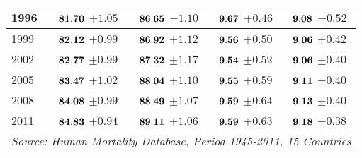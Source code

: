 \documentclass[10pt, titlepage]{article}%
\begin{document}
\begin{table}
\begin{tabular}{||l|c|c|c|c||}
  1996 &  $\bf 81.70$ $\pm 1.05$& $\bf 86.65$ $\pm 1.10$& $\bf 9.67$ $\pm 0.46$& $\bf 9.08$ $\pm 0.52$ \\ \hline\hline
  1999 &  $\bf 82.12$ $\pm 0.99$& $\bf 86.92$ $\pm 1.12$& $\bf 9.56$ $\pm 0.50$& $\bf 9.06$ $\pm 0.42$ \\ \hline\hline
  2002 &  $\bf 82.77$ $\pm 0.99$& $\bf 87.32$ $\pm 1.17$& $\bf 9.54$ $\pm 0.52$& $\bf 9.06$ $\pm 0.40$ \\ \hline\hline
  2005 &  $\bf 83.47$ $\pm 1.02$& $\bf 88.04$ $\pm 1.10$& $\bf 9.55$ $\pm 0.59$& $\bf 9.11$ $\pm 0.40$ \\ \hline\hline
  2008 &  $\bf 84.08$ $\pm 0.99$& $\bf 88.49$ $\pm 1.07$& $\bf 9.59$ $\pm 0.64$& $\bf 9.13$ $\pm 0.40$ \\ \hline\hline
  2011 &  $\bf 84.83$ $\pm 0.94$& $\bf 89.11$ $\pm 1.06$& $\bf 9.59$ $\pm 0.63$& $\bf 9.18$ $\pm 0.38$ \\ \hline\hline
              
\multicolumn{5}{||r||}{{\em Source: Human Mortality Database, Period 1945-2011, 15 Countries}} \\ \hline\hline
\end{tabular}
\label{table5a}
\end{table}
\end{document}
